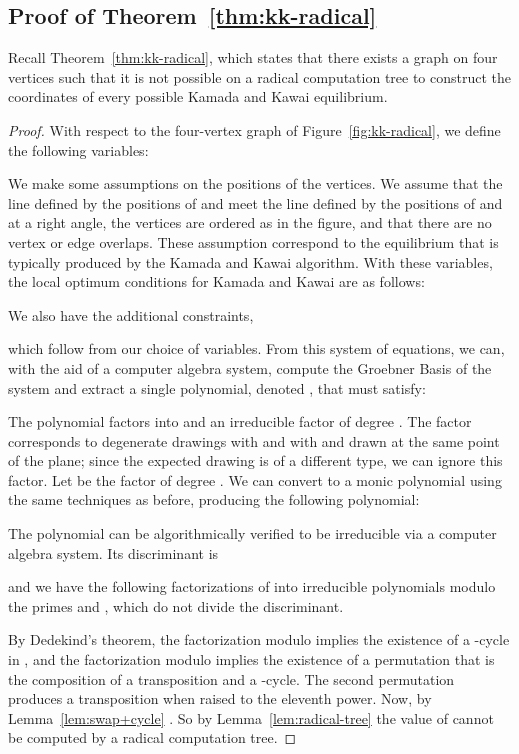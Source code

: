 \documentclass[oribibl,10pt]{llncs}
\begin{document}
\begin{appendix}
\subsection{Proof of Theorem~\ref{thm:kk-radical}}
Recall Theorem~\ref{thm:kk-radical}, which states that
there exists a graph on four vertices such that it is not possible on a radical computation tree to construct the coordinates of every possible Kamada and Kawai equilibrium.

\begin{proof}
With respect to the four-vertex graph of Figure~\ref{fig:kk-radical},
we define the following variables:

We make some assumptions on the positions of the vertices. We assume that the line defined by the positions of  and  meet the line defined by the positions of  and  at a right angle, the vertices are ordered as in the figure, and that there are no vertex or edge overlaps. These assumption correspond to the equilibrium that is typically produced by the Kamada and Kawai algorithm.
With these variables, the local optimum conditions for Kamada and Kawai are
as follows:

We also have the additional constraints,

which follow from our choice of variables. From this system of equations, we can, with the aid of a computer algebra system, compute the Groebner Basis of the system and extract a single polynomial, denoted , that  must satisfy:

The polynomial  factors into  and an irreducible factor of degree . The  factor corresponds to degenerate drawings with  and with  and  drawn at the same point of the plane; since the expected drawing is of a different type, we can ignore this factor.
Let  be the factor of degree . We can convert  to a monic polynomial using the same techniques as before, producing the following polynomial:

The polynomial  can be algorithmically verified to be irreducible via a computer algebra system. Its discriminant is

and we have the following factorizations of  into irreducible polynomials modulo the primes  and , which do not divide the discriminant.

By Dedekind's theorem, the factorization modulo  implies the existence of a -cycle in , and the factorization modulo  implies the existence of a permutation that is the composition of a transposition and a -cycle. The second permutation produces a transposition when raised to the eleventh power. Now, by Lemma~\ref{lem:swap+cycle} . So by Lemma~\ref{lem:radical-tree} the value of  cannot be computed by a radical computation tree.
\end{proof}


\end{appendix}
\end{document}
